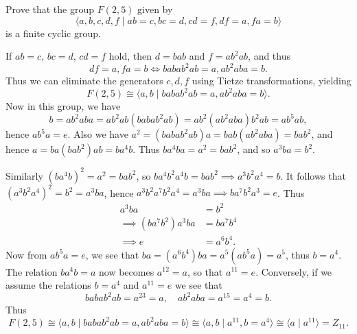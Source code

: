 \begin{questions}
\question Prove that the group $F(2,5)$ given by
  \[ \langle a,b,c,d,f \mid ab=c, bc=d, cd=f, df=a, fa=b \rangle \]
  is a finite cyclic group.
  \begin{solution}
    If $ab=c$, $bc=d$, $cd=f$ hold, then $d=bab$ and $f=ab^2ab$, and thus
    \[ df=a, fa=b \iff babab^2ab = a, ab^2aba = b. \]
    Thus we can eliminate the generators $c,d,f$ using Tietze transformations, yielding
    \[ F(2,5) \cong \langle a,b \mid babab^2ab=a, ab^2aba=b \rangle. \]
    Now in this group, we have
    \[ b = ab^2aba = ab^2ab(babab^2ab) = ab^2(ab^2aba)b^2ab = ab^5ab, \]
    hence $ab^5a=e$. Also we have $a^2 = (babab^2ab)a = bab(ab^2aba) = bab^2$,
    and hence $a = ba(bab^2)ab = ba^4b$. Thus $ba^4ba=a^2=bab^2$, and so $a^3ba=b^2$.

    Similarly $(ba^4b)^2=a^2=bab^2$, so $ba^4b^2a^4b=bab^2\implies a^3b^2a^4=b$. It follows that $(a^3b^2a^4)^2=b^2=a^3ba$, hence $a^3b^2a^7b^2a^4=a^3ba \implies ba^7b^2a^3 = e$. Thus
    \begin{align*}
      a^3ba &= b^2 \\
      \implies (ba^7b^2)a^3ba &= ba^7b^4 \\
      \implies e &= a^6b^4.
    \end{align*}
    Now from $ab^5a=e$, we see that $ba=(a^6b^4)ba=a^5(ab^5a)=a^5$, thus $b=a^4$. The relation $ba^4b=a$ now becomes $a^{12}=a$, so that $a^{11}=e$. Conversely, if we assume the relations $b=a^4$ and $a^{11}=e$ we see that
    \[ babab^2ab = a^{23} = a, \quad ab^2aba = a^{15} = a^4 = b. \]
    Thus
    \[ F(2,5) \cong \langle a,b \mid babab^2ab = a, ab^2aba = b \rangle \cong \langle a,b \mid a^{11}, b=a^4 \rangle \cong \langle a \mid a^{11} \rangle = Z_{11}. \]
  \end{solution}


\end{questions}
